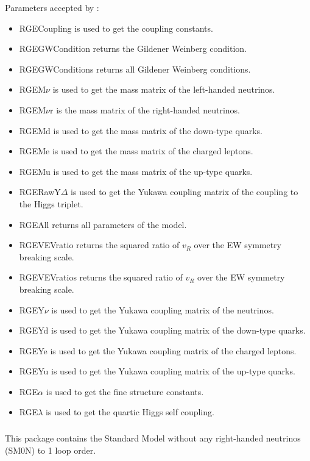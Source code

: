 \documentclass[10pt,a4paper,twoside]{scrartcl}
\begin{document}
Parameters accepted by :
\begin{itemize}
\item 
RGECoupling is used to get the coupling constants.
\item 
RGEGWCondition returns the Gildener Weinberg condition.
\item 
RGEGWConditions returns all Gildener Weinberg conditions.
\item 
RGEM$\nu$ is used to get the mass matrix of the left-handed neutrinos.
\item 
RGEM$\nu$r is the mass matrix of the right-handed neutrinos.
\item 
RGEMd is used to get the mass matrix of the down-type quarks.
\item 
RGEMe is used to get the mass matrix of the charged leptons.
\item 
RGEMu is used to get the mass matrix of the up-type quarks.
\item 
RGERawY$\Delta$ is used to get the Yukawa coupling matrix of the coupling to the Higgs triplet.
\item 
RGEAll returns all parameters of the model.
\item 
RGEVEVratio returns the squared ratio of $v_R$ over the EW symmetry breaking scale.
\item 
RGEVEVratios returns the squared ratio of $v_R$ over the EW symmetry breaking scale.
\item 
RGEY$\nu$ is used to get the Yukawa coupling matrix of the neutrinos.
\item 
RGEYd is used to get the Yukawa coupling matrix of the down-type quarks.
\item 
 RGEYe is used to get the Yukawa coupling matrix of the charged leptons.
\item 
RGEYu is used to get the Yukawa coupling matrix of the up-type quarks.
\item 
RGE$\alpha$ is used to get the fine structure constants.
\item 
RGE$\lambda$ is used to get the quartic Higgs self coupling.

\end{itemize}

\subsubsection[\package{RGESM0N}]{}
This package contains the Standard Model without any right-handed neutrinos
(SM0N) to 1 loop order.
\end{document}

